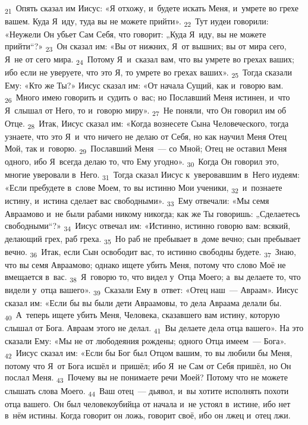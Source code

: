 \documentclass[a4paper,12pt]{article}
\begin{document}
\textsubscript{21}~Опять сказал им Иисус: «Я отхожу, и~будете искать Меня, и~умрете во грехе вашем. Куда Я~иду, туда вы не можете прийти».
\textsubscript{22}~Тут иудеи говорили: «Неужели Он убьет Сам Себя, что говорит: „Куда Я~иду, вы не можете прийти“?»
\textsubscript{23}~Он сказал им: «Вы от нижних, Я~от вышних; вы от мира сего, Я~не от сего мира.
\textsubscript{24}~Потому Я~и~сказал вам, что вы умрете во грехах ваших; ибо если не уверуете, что это Я, то умрете во грехах ваших».
\textsubscript{25}~Тогда сказали Ему: «Кто же Ты?» Иисус сказал им: «От начала Сущий, как и~говорю вам.
\textsubscript{26}~Много имею говорить и~судить о~вас; но Пославший Меня истинен, и~что Я~слышал от Него, то и~говорю миру».
\textsubscript{27}~Не поняли, что Он говорил им об Отце.
\textsubscript{28}~Итак, Иисус сказал им: «Когда вознесете Сына Человеческого, тогда узнаете, что это Я~и~что ничего не делаю от Себя, но как научил Меня Отец Мой, так и~говорю.
\textsubscript{29}~Пославший Меня~--- со Мной; Отец не оставил Меня одного, ибо Я~всегда делаю то, что Ему угодно».
\textsubscript{30}~Когда Он говорил это, многие уверовали в~Него.
\textsubscript{31}~Тогда сказал Иисус к~уверовавшим в~Него иудеям: «Если пребудете в~слове Моем, то вы истинно Мои ученики,
\textsubscript{32}~и~познаете истину, и~истина сделает вас свободными».
\textsubscript{33}~Ему отвечали: «Мы семя Авраамово и~не были рабами никому никогда; как же Ты говоришь: „Сделаетесь свободными“?»
\textsubscript{34}~Иисус отвечал им: «Истинно, истинно говорю вам: всякий, делающий грех, раб греха.
\textsubscript{35}~Но раб не пребывает в~доме вечно; сын пребывает вечно.
\textsubscript{36}~Итак, если Сын освободит вас, то истинно свободны будете.
\textsubscript{37}~Знаю, что вы семя Авраамово; однако ищете убить Меня, потому что слово Моё не вмещается в~вас.
\textsubscript{38}~Я~говорю то, что видел у~Отца Моего; а~вы делаете то, что видели у~отца вашего».
\textsubscript{39}~Сказали Ему в~ответ: «Отец наш~--- Авраам». Иисус сказал им: «Если бы вы были дети Авраамовы, то дела Авраама делали бы.
\textsubscript{40}~А~теперь ищете убить Меня, Человека, сказавшего вам истину, которую слышал от Бога. Авраам этого не делал.
\textsubscript{41}~Вы делаете дела отца вашего». На это сказали Ему: «Мы не от любодеяния рождены; одного Отца имеем~--- Бога».
\textsubscript{42}~Иисус сказал им: «Если бы Бог был Отцом вашим, то вы любили бы Меня, потому что Я~от Бога исшёл и~пришёл; ибо Я~не Сам от Себя пришёл, но Он послал Меня.
\textsubscript{43}~Почему вы не понимаете речи Моей? Потому что не можете слышать слова Моего.
\textsubscript{44}~Ваш отец~--- дьявол, и~вы хотите исполнять похоти отца вашего. Он был человекоубийца от начала и~не устоял в~истине, ибо нет в~нём истины. Когда говорит он ложь, говорит своё, ибо он лжец и~отец лжи.
\end{document}
